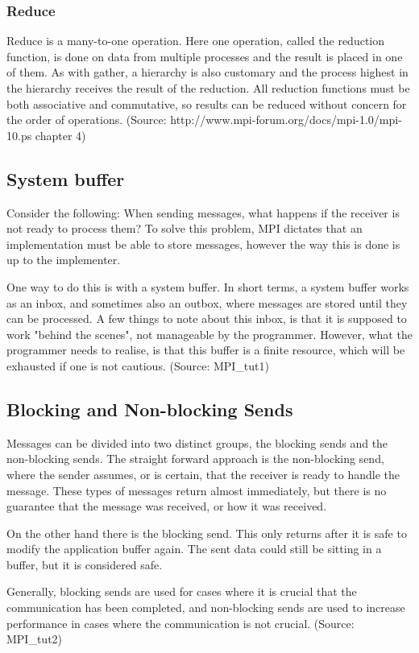 \subsubsection{Reduce}
Reduce is a many-to-one operation. Here one operation, called the reduction function, is done on data from multiple processes and the result is placed in one of them. As with gather, a hierarchy is also customary and the process highest in the hierarchy receives the result of the reduction. All reduction functions must be both associative and commutative, so results can be reduced without concern for the order of operations.
(Source: http://www.mpi-forum.org/docs/mpi-1.0/mpi-10.ps chapter 4)

\subsection{System buffer}
Consider the following: When sending messages, what happens if the receiver is not ready to process them? To solve this problem, MPI dictates that an implementation must be able to store messages, however the way this is done is up to the implementer.

One way to do this is with a system buffer. In short terms, a system buffer works as an inbox, and sometimes also an outbox, where messages are stored until they can be processed. A few things to note about this inbox, is that it is supposed to work "behind the scenes", not manageable by the programmer. However, what the programmer needs to realise, is that this buffer is a finite resource, which will be exhausted if one is not cautious.
(Source: MPI\_tut1)

\subsection{Blocking and Non-blocking Sends}
Messages can be divided into two distinct groups, the blocking sends and the non-blocking sends. The straight forward approach is the non-blocking send, where the sender assumes, or is certain, that the receiver is ready to handle the message. These types of messages return almost immediately, but there is no guarantee that the message was received, or how it was received.

On the other hand there is the blocking send. This only returns after it is safe to modify the application buffer again. The sent data could still be sitting in a buffer, but it is considered safe.

Generally, blocking sends are used for cases where it is crucial that the communication has been completed, and non-blocking sends are used to increase performance in cases where the communication is not crucial.
(Source: MPI\_tut2)

